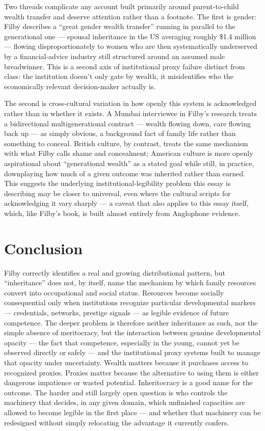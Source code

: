 \documentclass[11pt]{article}
\begin{document}
Two threads complicate any account built primarily around parent-to-child wealth transfer and deserve attention rather than a footnote. The first is gender: Filby describes a ``great gender wealth transfer'' running in parallel to the generational one --- spousal inheritance in the US averaging roughly \$1.4 million --- flowing disproportionately to women who are then systematically underserved by a financial-advice industry still structured around an assumed male breadwinner. This is a second axis of institutional proxy failure distinct from class: the institution doesn't only gate by wealth, it misidentifies who the economically relevant decision-maker actually is.

The second is cross-cultural variation in how openly this system is acknowledged rather than in whether it exists. A Mumbai interviewee in Filby's research treats a bidirectional multigenerational contract --- wealth flowing down, care flowing back up --- as simply obvious, a background fact of family life rather than something to conceal. British culture, by contrast, treats the same mechanism with what Filby calls shame and concealment; American culture is more openly aspirational about ``generational wealth'' as a stated goal while still, in practice, downplaying how much of a given outcome was inherited rather than earned. This suggests the underlying institutional-legibility problem this essay is describing may be closer to universal, even where the cultural scripts for acknowledging it vary sharply --- a caveat that also applies to this essay itself, which, like Filby's book, is built almost entirely from Anglophone evidence.

\section{Conclusion}

Filby correctly identifies a real and growing distributional pattern, but ``inheritance'' does not, by itself, name the mechanism by which family resources convert into occupational and social status. Resources become socially consequential only when institutions recognize particular developmental markers --- credentials, networks, prestige signals --- as legible evidence of future competence. The deeper problem is therefore neither inheritance as such, nor the simple absence of meritocracy, but the interaction between genuine developmental opacity --- the fact that competence, especially in the young, cannot yet be observed directly or safely --- and the institutional proxy systems built to manage that opacity under uncertainty. Wealth matters because it purchases access to recognized proxies. Proxies matter because the alternative to using them is either dangerous impatience or wasted potential. Inheritocracy is a good name for the outcome. The harder and still largely open question is who controls the machinery that decides, in any given domain, which unfinished capacities are allowed to become legible in the first place --- and whether that machinery can be redesigned without simply relocating the advantage it currently confers.
\end{document}

